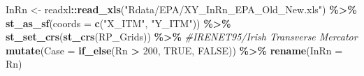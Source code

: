 \documentclass[
  12pt,
]{article}
\newenvironment{Shaded}{\begin{snugshade}}{\end{snugshade}}
\newcommand{\CommentTok}[1]{\textcolor[rgb]{0.56,0.35,0.01}{\textit{#1}}}
\newcommand{\DataTypeTok}[1]{\textcolor[rgb]{0.13,0.29,0.53}{#1}}
\newcommand{\DecValTok}[1]{\textcolor[rgb]{0.00,0.00,0.81}{#1}}
\newcommand{\KeywordTok}[1]{\textcolor[rgb]{0.13,0.29,0.53}{\textbf{#1}}}
\newcommand{\NormalTok}[1]{#1}
\newcommand{\OperatorTok}[1]{\textcolor[rgb]{0.81,0.36,0.00}{\textbf{#1}}}
\newcommand{\OtherTok}[1]{\textcolor[rgb]{0.56,0.35,0.01}{#1}}
\newcommand{\StringTok}[1]{\textcolor[rgb]{0.31,0.60,0.02}{#1}}
\begin{document}
\begin{Shaded}
\begin{Highlighting}[]
\NormalTok{  InRn \textless{}{-}}\StringTok{ }\NormalTok{readxl}\OperatorTok{::}\KeywordTok{read\_xls}\NormalTok{(}\StringTok{"Rdata/EPA/XY\_InRn\_EPA\_Old\_New.xls"}\NormalTok{) }\OperatorTok{\%\textgreater{}\%}
\StringTok{    }\KeywordTok{st\_as\_sf}\NormalTok{(}\DataTypeTok{coords =} \KeywordTok{c}\NormalTok{(}\StringTok{"X\_ITM"}\NormalTok{, }\StringTok{"Y\_ITM"}\NormalTok{)) }\OperatorTok{\%\textgreater{}\%}
\StringTok{    }\KeywordTok{st\_set\_crs}\NormalTok{(}\KeywordTok{st\_crs}\NormalTok{(RP\_Grids)) }\OperatorTok{\%\textgreater{}\%}\StringTok{ }\CommentTok{\#IRENET95/Irish Transverse Mercator}
\StringTok{    }\KeywordTok{mutate}\NormalTok{(}\DataTypeTok{Case =} \KeywordTok{if\_else}\NormalTok{(Rn }\OperatorTok{\textgreater{}}\StringTok{ }\DecValTok{200}\NormalTok{, }\OtherTok{TRUE}\NormalTok{, }\OtherTok{FALSE}\NormalTok{)) }\OperatorTok{\%\textgreater{}\%}
\StringTok{    }\KeywordTok{rename}\NormalTok{(}\DataTypeTok{InRn   =}\NormalTok{ Rn)}
\end{Highlighting}
\end{Shaded}
\end{document}
